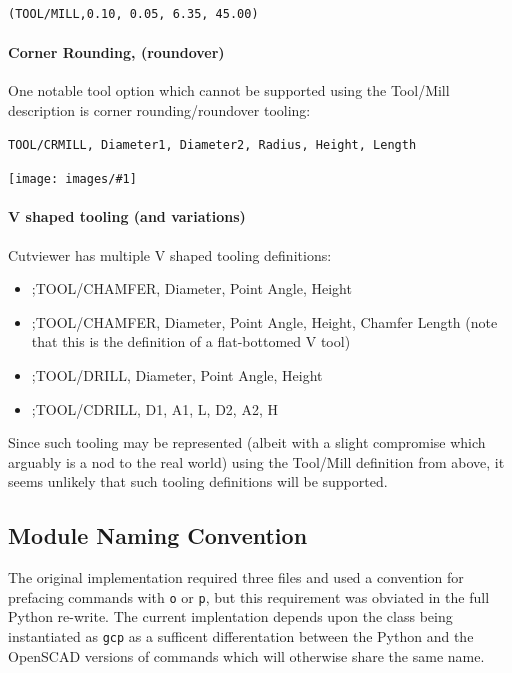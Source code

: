 \documentclass{ltxdoc}
\newcommand{\includeimage}[1]{\bigskip\noindent\texttt{[image: images/\#1]}\bigskip}
\begin{document}
\begin{verbatim}
(TOOL/MILL,0.10, 0.05, 6.35, 45.00)
\end{verbatim}

\paragraph{Corner Rounding, (roundover)} 

One notable tool option which cannot be supported using the Tool/Mill description is corner rounding/roundover tooling:

\begin{verbatim}
TOOL/CRMILL, Diameter1, Diameter2, Radius, Height, Length
\end{verbatim}

\includeimage{cutviewer_corner_round.png}

\paragraph{V shaped tooling (and variations)}

Cutviewer has multiple V shaped tooling definitions:

\begin{itemize}
\item ;TOOL/CHAMFER, Diameter, Point Angle, Height
\item ;TOOL/CHAMFER, Diameter, Point Angle, Height, Chamfer Length (note that this is the definition of a flat-bottomed V tool)
\item ;TOOL/DRILL, Diameter, Point Angle, Height
\item ;TOOL/CDRILL, D1, A1, L, D2, A2, H
\end{itemize}

\noindent Since such tooling may be represented (albeit with a slight compromise which arguably is a nod to the real world) using the Tool/Mill definition from above, it seems unlikely that such tooling definitions will be supported.

\subsection{Module Naming Convention}

The original implementation required three files and used a convention for prefacing commands with \verb|o| or \verb|p|, but this requirement was obviated in the full Python re-write. The current implentation depends upon the class being instantiated as \verb|gcp| as a sufficent differentation between the Python and the OpenSCAD versions of commands which will otherwise share the same name.
\end{document}
